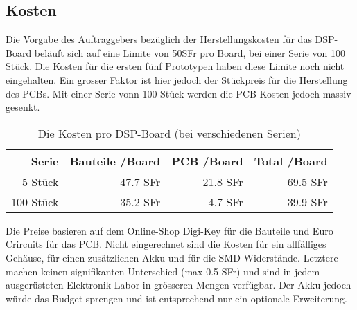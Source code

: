 \subsection{Kosten}
\label{sec:Kosten}

Die Vorgabe des Auftraggebers bezüglich der Herstellungskosten für das DSP-Board beläuft sich auf eine Limite von 50SFr pro Board, bei einer Serie von 100 Stück. Die Kosten für die ersten fünf Prototypen haben diese Limite noch nicht eingehalten. Ein grosser Faktor ist hier jedoch der Stückpreis für die Herstellung des PCBs. Mit einer Serie vonn 100 Stück werden die PCB-Kosten jedoch massiv gesenkt.

\begin{table}[H]
	\centering
	\begin{tabular}{|r|r|r|r|}
		\hline
		\textbf{Serie} & \textbf{Bauteile /Board}             & \textbf{PCB /Board} & \textbf{Total /Board} \\ \hline
		5 Stück              &           47.7 SFr      & 21.8 SFr & 69.5 SFr    \\ \hline
		100 Stück           & 35.2 SFr                       & 4.7 SFr  & 39.9 SFr    \\ \hline
	\end{tabular}
	\caption{Die Kosten pro DSP-Board (bei verschiedenen Serien)}
	\label{tab:kosten}
\end{table}


Die Preise basieren auf dem Online-Shop Digi-Key \cite{www:digikey} für die Bauteile und Euro Crircuits \cite{www:eurocircuits} für das PCB.
Nicht eingerechnet  sind die Kosten für ein allfälliges Gehäuse, für einen zusätzlichen Akku und für die SMD-Widerstände. Letztere machen keinen signifikanten Unterschied (max 0.5 SFr) und sind in jedem ausgerüsteten Elektronik-Labor in grösseren Mengen verfügbar. Der Akku jedoch würde das Budget sprengen und ist entsprechend nur ein optionale Erweiterung.